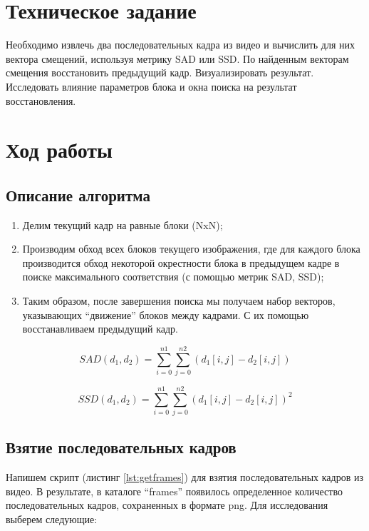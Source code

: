 \section{Техническое задание}

Необходимо извлечь два последовательных кадра из видео и вычислить для них вектора смещений, используя метрику SAD или SSD. По найденным векторам смещения восстановить предыдущий кадр. Визуализировать результат. Исследовать влияние параметров блока и окна поиска на результат восстановления. 

\section{Ход работы}

\subsection{Описание алгоритма}

\begin{enumerate}
	\item Делим текущий кадр на равные блоки (NxN);
	\item Производим обход всех блоков текущего изображения, где для каждого блока производится обход некоторой окрестности блока в предыдущем кадре в поиске максимального соответствия (с помощью метрик SAD, SSD);
	\item  Таким образом, после завершения поиска мы получаем набор векторов, указывающих "`движение"' блоков между кадрами. С их помощью восстанавливаем предыдущий кадр.
\end{enumerate}

\begin{equation}
	SAD(d_1,d_2) = \sum_{i=0}^{n1}\sum_{j=0}^{n2}(d_1[i,j] - d_2[i,j])
\end{equation}

\begin{equation}
	SSD(d_1,d_2) = \sum_{i=0}^{n1}\sum_{j=0}^{n2}(d_1[i,j] - d_2[i,j])^2
\end{equation}

\subsection{Взятие последовательных кадров}

Напишем скрипт (листинг \vref{lst:getframes}) для взятия последовательных кадров из видео. В результате, в каталоге "`frames"' появилось определенное количество последовательных кадров, сохраненных в формате png. Для исследования выберем следующие:

